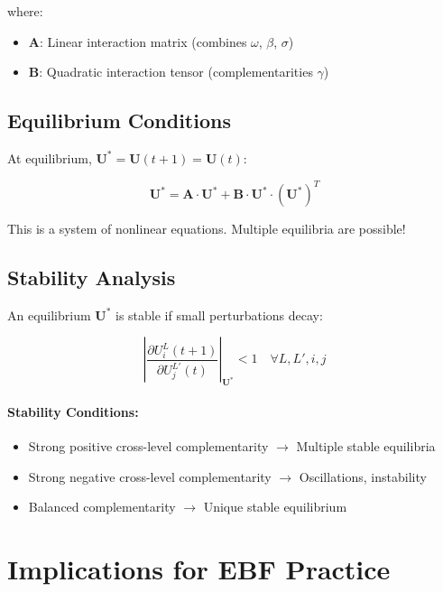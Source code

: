 where:
\begin{itemize}
\item $\mathbf{A}$: Linear interaction matrix (combines $\omega$, $\beta$, $\sigma$)
\item $\mathbf{B}$: Quadratic interaction tensor (complementarities $\gamma$)
\end{itemize}

\subsection{Equilibrium Conditions}

At equilibrium, $\mathbf{U}^* = \mathbf{U}(t+1) = \mathbf{U}(t)$:

\begin{equation}
\mathbf{U}^* = \mathbf{A} \cdot \mathbf{U}^* + \mathbf{B} \cdot \mathbf{U}^* \cdot (\mathbf{U}^*)^T
\end{equation}

This is a system of nonlinear equations. Multiple equilibria are possible!

\subsection{Stability Analysis}

An equilibrium $\mathbf{U}^*$ is stable if small perturbations decay:

\begin{equation}
\left| \frac{\partial U^L_i(t+1)}{\partial U^{L'}_j(t)} \right|_{\mathbf{U}^*} < 1 \quad \forall L, L', i, j
\end{equation}

\paragraph{Stability Conditions:}
\begin{itemize}
\item Strong positive cross-level complementarity $\to$ Multiple stable equilibria
\item Strong negative cross-level complementarity $\to$ Oscillations, instability
\item Balanced complementarity $\to$ Unique stable equilibrium
\end{itemize}

\section{Implications for EBF Practice}
\label{sec:aaa-implications}

